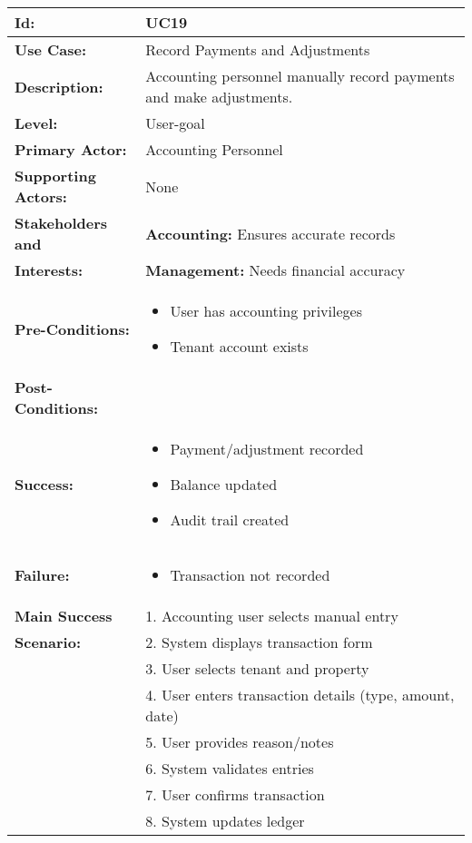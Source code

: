 \documentclass[12pt]{article}
\begin{document}
\begin{longtable}{|p{3cm}|p{11cm}|}
\hline
\textbf{Id:} & UC19 \\
\hline
\textbf{Use Case:} & Record Payments and Adjustments \\
\hline
\textbf{Description:} & Accounting personnel manually record payments and make adjustments. \\
\hline
\textbf{Level:} & User-goal \\
\hline
\textbf{Primary Actor:} & Accounting Personnel \\
\hline
\textbf{Supporting Actors:} & None \\
\hline
\textbf{Stakeholders and} & \textbf{Accounting:} Ensures accurate records \\
\textbf{Interests:} & \textbf{Management:} Needs financial accuracy \\
\hline
\textbf{Pre-Conditions:} & 
\begin{itemize}
    \item User has accounting privileges
    \item Tenant account exists
\end{itemize} \\
\hline
\textbf{Post-Conditions:} & \\
\textbf{Success:} & 
\begin{itemize}
    \item Payment/adjustment recorded
    \item Balance updated
    \item Audit trail created
\end{itemize} \\
\textbf{Failure:} & 
\begin{itemize}
    \item Transaction not recorded
\end{itemize} \\
\hline
\textbf{Main Success} & 1. Accounting user selects manual entry \\
\textbf{Scenario:} & 2. System displays transaction form \\
& 3. User selects tenant and property \\
& 4. User enters transaction details (type, amount, date) \\
& 5. User provides reason/notes \\
& 6. System validates entries \\
& 7. User confirms transaction \\
& 8. System updates ledger \\

\end{longtable}
\end{document}
